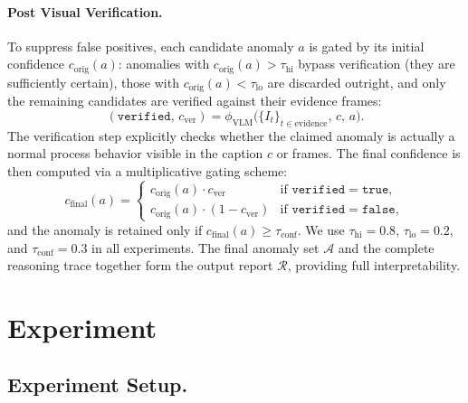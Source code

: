 \documentclass[runningheads]{llncs}
\begin{document}
\paragraph{\textbf{Post Visual Verification.}}
\label{sec:verify}
To suppress false positives, each candidate anomaly $a$ is gated by its initial confidence $c_{\text{orig}}(a)$: anomalies with $c_{\text{orig}}(a) > \tau_{\text{hi}}$ bypass verification (they are sufficiently certain), those with $c_{\text{orig}}(a) < \tau_{\text{lo}}$ are discarded outright, and only the remaining candidates are verified against their evidence frames:
%
\begin{equation}
  (\texttt{verified},\, c_{\text{ver}}) = \phi_{\text{VLM}}\big(\{I_{t}\}_{t \in \text{evidence}},\, c,\, a\big).
\end{equation}
%
The verification step explicitly checks whether the claimed anomaly is actually a normal process behavior visible in the caption $c$ or frames. The final confidence is then computed via a multiplicative gating scheme:
%
\begin{equation}
  c_{\text{final}}(a) = \begin{cases}
  c_{\text{orig}}(a) \cdot c_{\text{ver}} & \text{if } \texttt{verified} = \texttt{true}, \\
  c_{\text{orig}}(a) \cdot (1 - c_{\text{ver}}) & \text{if } \texttt{verified} = \texttt{false},
  \end{cases}
  \label{eq:conf_gate}
\end{equation}
%
and the anomaly is retained only if $c_{\text{final}}(a) \geq \tau_{\text{conf}}$. We use $\tau_{\text{hi}} = 0.8$, $\tau_{\text{lo}} = 0.2$, and $\tau_{\text{conf}} = 0.3$ in all experiments. The final anomaly set $\mathcal{A}$ and the complete reasoning trace together form the output report $\mathcal{R}$, providing full interpretability.


\section{Experiment}

\subsection{Experiment Setup.}
\end{document}
